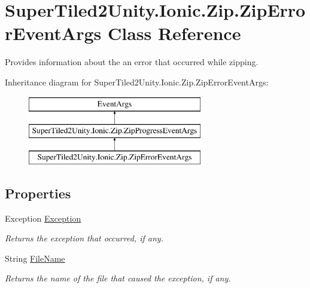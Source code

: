 \hypertarget{class_super_tiled2_unity_1_1_ionic_1_1_zip_1_1_zip_error_event_args}{}\section{Super\+Tiled2\+Unity.\+Ionic.\+Zip.\+Zip\+Error\+Event\+Args Class Reference}
\label{class_super_tiled2_unity_1_1_ionic_1_1_zip_1_1_zip_error_event_args}


Provides information about the an error that occurred while zipping.  


Inheritance diagram for Super\+Tiled2\+Unity.\+Ionic.\+Zip.\+Zip\+Error\+Event\+Args\+:\begin{figure}[H]
\begin{center}
\leavevmode
\includegraphics[height=3.000000cm]{class_super_tiled2_unity_1_1_ionic_1_1_zip_1_1_zip_error_event_args}
\end{center}
\end{figure}
\subsection*{Properties}
\begin{DoxyCompactItemize}
\item 
Exception \mbox{\hyperlink{class_super_tiled2_unity_1_1_ionic_1_1_zip_1_1_zip_error_event_args_aa32098f8b5a00fab4c429264745be139}{Exception}}
\begin{DoxyCompactList}\small\item\em Returns the exception that occurred, if any. \end{DoxyCompactList}\item 
String \mbox{\hyperlink{class_super_tiled2_unity_1_1_ionic_1_1_zip_1_1_zip_error_event_args_a876d391994b97d490d8cb2a641f650d5}{File\+Name}}
\begin{DoxyCompactList}\small\item\em Returns the name of the file that caused the exception, if any. \end{DoxyCompactList}\end{DoxyCompactItemize}


